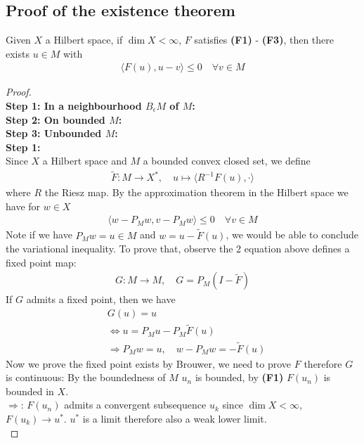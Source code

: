 \subsection{Proof of the existence theorem}
\begin{proposition}
Given $X$ a Hilbert space, if $\dim X < \infty$, $F$ satisfies \textbf{(F1)} - \textbf{(F3)}, then there exists $u \in M$ with
	\begin{align*}
		\langle F(u), u - v \rangle \le 0 \quad \forall v \in M
	\end{align*} 
\end{proposition}
\begin{proof}
\quad\\
\textbf{Step 1: In a neighbourhood $B_\epsilon M$ of $M$:}\\
\textbf{Step 2: On bounded $M$:}\\
\textbf{Step 3: Unbounded $M$:}\\
\textbf{Step 1:}\\
Since $X$ a Hilbert space and $M$ a bounded convex closed set, we define
\begin{align*}
	\tilde{F}: M \rightarrow X^*,\quad u \mapsto \langle R^{-1} F(u), \cdot \rangle 
\end{align*}
where $R$ the Riesz map. By the approximation theorem in the Hilbert space we have for $w \in X$
\begin{align*}
	\langle w - P_M w,  v - P_M w \rangle \le 0 \quad \forall v \in M
\end{align*}
Note if we have $P_M w = u \in M$ and $w = u - \tilde{F}(u) $, we would be able to conclude the variational inequality. To prove that, observe the 2 equation above defines a fixed point map:
\begin{align*}
	G: M \rightarrow M, \quad G =  P_M(I - \tilde{F}) 
\end{align*} 
If $G$ admits a fixed point, then we have
\begin{align*}
	&G(u) = u\\
	&\Leftrightarrow
	u = P_M u - P_M\tilde{F}(u)\\
	& \Rightarrow P_M w = u, \quad w - P_M w = - \tilde{F}(u)
\end{align*}
Now we prove the fixed point exists by Brouwer, we need to prove $F$ therefore $G$ is continuous: By the boundedness of $M$ $u_n$ is bounded, by \textbf{(F1)} $F(u_n)$ is bounded in $X$.\\
$\Rightarrow$: $F(u_n)$ admits a convergent subsequence $u_k$ since $\dim X < \infty$, $F(u_k) \rightarrow u^*$. $u^*$ is a limit therefore also a weak lower limit. \\

\end{proof}
